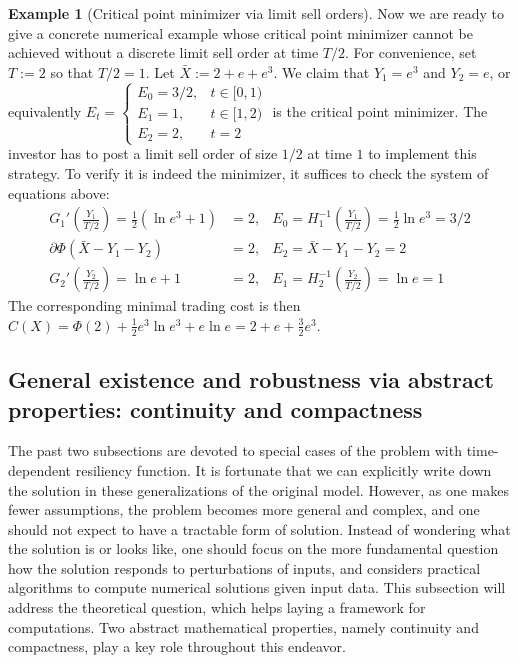\documentclass[openany,oneside]{article}
\theoremstyle{definition}
\newtheorem{eg}[thm]{Example}
\theoremstyle{remark}
\begin{document}
\begin{eg}[Critical point minimizer via limit sell orders]
Now we are ready to give a concrete numerical example whose critical point minimizer cannot be achieved without a discrete limit sell order at time $T/2$. For convenience, set $T:=2$ so that $T/2 =1$. Let $\bar{X} := 2+e+e^3$. We claim that $Y_1 = e^3$ and $Y_2 = e$, or equivalently $E_t =
\begin{cases}
E_0 = 3/2, & t\in[0,1) \\
E_1 = 1, & t\in[1,2) \\
E_2 = 2, & t=2
\end{cases}$
is the critical point minimizer. The investor has to post a limit sell order of size $1/2$ at time $1$ to implement this strategy. To verify it is indeed the minimizer, it suffices to check the system of equations above:
\begin{align*}
G_1'\left(\frac{Y_1}{T/2}\right) = \frac{1}{2}(\ln e^3 + 1) &= 2, & E_0 = H_1^{-1}\left(\frac{Y_1}{T/2}\right) = \frac{1}{2}\ln e^3 = 3/2 \\
\partial \Phi(\bar{X}-Y_1-Y_2) &= 2, & E_2 = \bar{X}-Y_1-Y_2 = 2 \\
G_2'\left(\frac{Y_2}{T/2}\right) = \ln e + 1 &= 2, & E_1 = H_2^{-1}\left(\frac{Y_2}{T/2}\right) = \ln e = 1
\end{align*}
The corresponding minimal trading cost is then $C(X) = \Phi(2) + \frac{1}{2} e^3 \ln e^3 + e \ln e = 2+e+\frac{3}{2}e^3$.
\end{eg}


\subsection{General existence and robustness via abstract properties: continuity and compactness}
The past two subsections are devoted to special cases of the problem with time-dependent resiliency function. It is fortunate that we can explicitly write down the solution in these generalizations of the original model. However, as one makes fewer assumptions, the problem becomes more general and complex, and one should not expect to have a tractable form of solution. Instead of wondering what the solution is or looks like, one should focus on the more fundamental question how the solution responds to perturbations of inputs, and considers practical algorithms to compute numerical solutions given input data. This subsection will address the theoretical question, which helps laying a framework for computations. Two abstract mathematical properties, namely continuity and compactness, play a key role throughout this endeavor.
\end{document}
